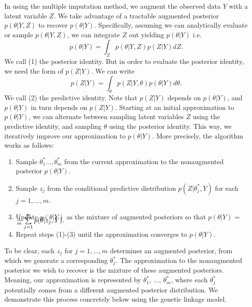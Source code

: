 \documentclass{article}
\begin{document}
In using the multiple imputation method, we augment the observed data $Y$ with a latent variable $Z$. 
We take advantage of a tractable augmented posterior $p(\theta | Y, Z)$ to recover $p(\theta | Y)$. 
Specifically, assuming we can analytically evaluate or sample $p(\theta | Y, Z)$, 
we can integrate $Z$ out yielding $p(\theta | Y)$ i.e.
\begin{equation}
    p(\theta | Y) = \int_{Z} p(\theta | Y, Z)p(Z | Y) dZ. \tag{1}
\end{equation}
We call (1) the posterior identity. 
But in order to evaluate the posterior identity, we need the form of $p(Z | Y)$. 
We can write 
\begin{equation}
    p(Z | Y) = \int_{\theta} p(Z | Y, \theta)p(\theta | Y)d\theta. \tag{2}
\end{equation}
We call (2) the predictive identity. 
Note that $p(Z | Y)$ depends on $p(\theta | Y)$, and $p(\theta | Y)$ in turn depends on $p(Z | Y)$. 
Starting at an initial approximation to $p(\theta | Y)$, 
we can alternate between sampling latent variables $Z$ using the predictive identity, 
and sampling $\theta$ using the posterior identity. This way, we iteratively improve our approximation to $p(\theta | Y)$. 
More precisely, the algorithm works as follows:
\begin{enumerate}[left=3em, topsep=20pt, itemsep=2pt]
\item Sample $\theta_{1}^{\ast} ..., \theta_{m}^{\ast}$ from the current approximation to the nonaugmented posterior $p(\theta | Y).$
\item Sample $z_j$ from the conditional predictive distribution $p(Z | \theta_{j}^{\ast}, Y)$ for each $j = 1, ..., m$.
\item Update $p(\theta | Y)$ as the mixture of augmented posteriors 
so that $p(\theta | Y)$ = $\smash{\frac{1}{m} \sum\limits_{j=1}^{m} p(\theta | z_j, Y)}.$ %
\item Repeat steps (1)-(3) until the approximation converges to $p(\theta | Y)$. 
\end{enumerate}

To be clear, each $z_j$ for $j = 1, ..., m$ determines an augmented posterior, 
from which we generate a corresponding $\theta_{j}^{\ast}$. 
The approximation to the nonaugmented posterior we wish to recover is the mixture of these augmented posteriors. 
Meaning, our approximation is represented by $\theta_{1}^{\ast}$, ..., $\theta_{m}^{\ast}$, 
where each $\theta_{j}^{\ast}$ potentially comes from a different augmented posterior distribution. 
We demonstrate this process concretely below using the genetic linkage model. 
\end{document}
